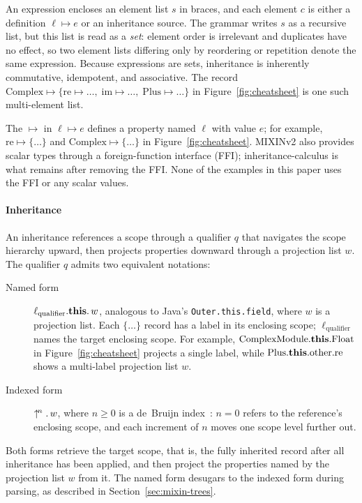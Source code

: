 An expression encloses an element list $s$ in braces, and each element
$c$ is either a definition $\ell \mapsto e$ or an inheritance source.
The grammar writes $s$ as a recursive list, but this list is read as a
\emph{set}: element order is irrelevant and duplicates have no effect,
so two element lists differing only by reordering or repetition denote
the same expression. Because expressions are sets, inheritance is
inherently commutative, idempotent, and associative.
The record $\mathrm{Complex} \mapsto \{ \mathrm{re} \mapsto \ldots,\;
\mathrm{im} \mapsto \ldots,\; \mathrm{Plus} \mapsto \ldots \}$ in
Figure~\ref{fig:cheatsheet} is one such multi-element list.

The $\mapsto$ in $\ell \mapsto e$ defines a property named $\ell$ with
value $e$; for example, $\mathrm{re} \mapsto \{\ldots\}$ and
$\mathrm{Complex} \mapsto \{\ldots\}$ in Figure~\ref{fig:cheatsheet}.
MIXINv2 also provides scalar types through a
foreign-function interface (FFI); inheritance-calculus is what remains
after removing the FFI.
None of the examples in this paper uses the FFI or any scalar values.

\paragraph{Inheritance}
An inheritance references a scope through a qualifier $q$ that
navigates the scope hierarchy upward, then projects properties downward
through a projection list $w$. The qualifier $q$ admits two equivalent
notations:
\begin{description}
  \item[Named form]
    $\ell_{\mathrm{qualifier}}.\mathbf{this}.\, w$,
    analogous to Java's \texttt{Outer.this.field}, where $w$ is a
    projection list.
    Each $\{\ldots\}$ record has a label in its enclosing scope;
    $\ell_{\mathrm{qualifier}}$ names the target enclosing scope.
    For example, $\mathrm{ComplexModule}.\mathbf{this}.\mathrm{Float}$
    in Figure~\ref{fig:cheatsheet} projects a single label, while
    $\mathrm{Plus}.\mathbf{this}.\mathrm{other}.\mathrm{re}$ shows a
    multi-label projection list $w$.
  \item[Indexed form]
    $\uparrow^{\!n}.\, w$,
    where $n \ge 0$ is a de~Bruijn index~\cite{debruijn1972-nameless-dummies}:
    $n = 0$ refers to the reference's enclosing scope,
    and each increment of $n$ moves one scope level further out.
\end{description}
Both forms retrieve the target scope, that is, the fully inherited record
after all inheritance has been applied, and then project the properties
named by the projection list $w$ from it.
The named form desugars to the indexed form during parsing,
as described in Section~\ref{sec:mixin-trees}.

